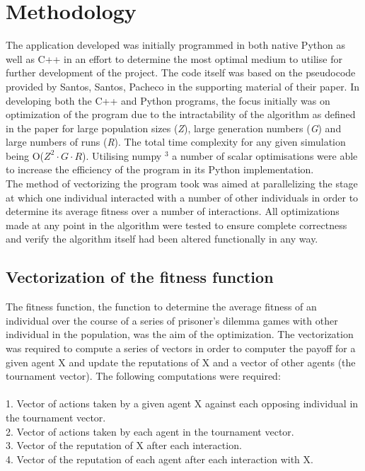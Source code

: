 \documentclass[10pt,a4paper]{article}
\begin{document}
\section{Methodology}
The application developed was initially programmed in both native Python as well as C++ in an effort to determine the most optimal medium to utilise for further development of the project.
The code itself was based on the pseudocode provided by Santos, Santos, Pacheco in the supporting material of their paper.
In developing both the C++ and Python programs, the focus initially was on optimization of the program due to the intractability of the algorithm as defined in the paper for large population sizes (\emph{Z}), large generation numbers (\emph{G}) and large numbers of runs (\emph{R}).
The total time complexity for any given simulation being O(\emph{$Z^{2} \cdot G\cdot R$}).
Utilising numpy $^{3}$ a number of scalar optimisations were able to increase the efficiency of the program in its Python implementation. 
\\
The method of vectorizing the program took was aimed at parallelizing the stage at which one individual interacted with a number of other individuals in order to determine its average fitness over a number of interactions. 
All optimizations made at any point in the algorithm were tested to ensure complete correctness and verify the algorithm itself had been altered functionally in any way.
\\
\subsection{Vectorization of the fitness function}
The fitness function, the function to determine the average fitness of an individual over the course of a series of prisoner's dilemma games with other individual in the population, was the aim of the optimization. 
The vectorization was required to compute a series of vectors in order to computer the payoff for a given agent X and update the reputations of X and a vector of other agents (the tournament vector).
The following computations were required:
\\
\\ 1. Vector of actions taken by a given agent X against each opposing individual in the tournament vector.
\\ 2. Vector of actions taken by each agent in the tournament vector.
\\ 3. Vector of the reputation of X after each interaction.
\\ 4. Vector of the reputation of each agent after each interaction with X. \\\\
\end{document}
